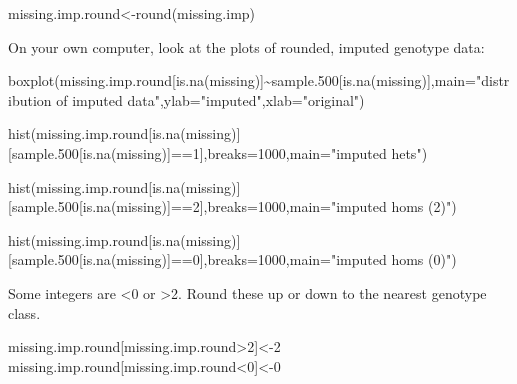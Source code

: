 \documentclass[
]{book}
\newenvironment{Shaded}{\begin{snugshade}}{\end{snugshade}}
\newcommand{\AttributeTok}[1]{\textcolor[rgb]{0.77,0.63,0.00}{#1}}
\newcommand{\DecValTok}[1]{\textcolor[rgb]{0.00,0.00,0.81}{#1}}
\newcommand{\FloatTok}[1]{\textcolor[rgb]{0.00,0.00,0.81}{#1}}
\newcommand{\FunctionTok}[1]{\textcolor[rgb]{0.00,0.00,0.00}{#1}}
\newcommand{\NormalTok}[1]{#1}
\newcommand{\OtherTok}[1]{\textcolor[rgb]{0.56,0.35,0.01}{#1}}
\newcommand{\SpecialCharTok}[1]{\textcolor[rgb]{0.00,0.00,0.00}{#1}}
\newcommand{\StringTok}[1]{\textcolor[rgb]{0.31,0.60,0.02}{#1}}
\begin{document}
\begin{Shaded}
\begin{Highlighting}[]
\NormalTok{missing.imp.round}\OtherTok{\textless{}{-}}\FunctionTok{round}\NormalTok{(missing.imp)}
\end{Highlighting}
\end{Shaded}

On your own computer, look at the plots of rounded, imputed genotype data:

\begin{Shaded}
\begin{Highlighting}[]
\FunctionTok{boxplot}\NormalTok{(missing.imp.round[}\FunctionTok{is.na}\NormalTok{(missing)]}\SpecialCharTok{\textasciitilde{}}\NormalTok{sample}\FloatTok{.500}\NormalTok{[}\FunctionTok{is.na}\NormalTok{(missing)],}\AttributeTok{main=}\StringTok{"distribution of imputed data"}\NormalTok{,}\AttributeTok{ylab=}\StringTok{"imputed"}\NormalTok{,}\AttributeTok{xlab=}\StringTok{"original"}\NormalTok{)}

\FunctionTok{hist}\NormalTok{(missing.imp.round[}\FunctionTok{is.na}\NormalTok{(missing)][sample}\FloatTok{.500}\NormalTok{[}\FunctionTok{is.na}\NormalTok{(missing)]}\SpecialCharTok{==}\DecValTok{1}\NormalTok{],}\AttributeTok{breaks=}\DecValTok{1000}\NormalTok{,}\AttributeTok{main=}\StringTok{"imputed hets"}\NormalTok{)}

\FunctionTok{hist}\NormalTok{(missing.imp.round[}\FunctionTok{is.na}\NormalTok{(missing)][sample}\FloatTok{.500}\NormalTok{[}\FunctionTok{is.na}\NormalTok{(missing)]}\SpecialCharTok{==}\DecValTok{2}\NormalTok{],}\AttributeTok{breaks=}\DecValTok{1000}\NormalTok{,}\AttributeTok{main=}\StringTok{"imputed homs (2)"}\NormalTok{)}

\FunctionTok{hist}\NormalTok{(missing.imp.round[}\FunctionTok{is.na}\NormalTok{(missing)][sample}\FloatTok{.500}\NormalTok{[}\FunctionTok{is.na}\NormalTok{(missing)]}\SpecialCharTok{==}\DecValTok{0}\NormalTok{],}\AttributeTok{breaks=}\DecValTok{1000}\NormalTok{,}\AttributeTok{main=}\StringTok{"imputed homs (0)"}\NormalTok{) }
\end{Highlighting}
\end{Shaded}

Some integers are \textless0 or \textgreater2. Round these up or down to the nearest genotype class.

\begin{Shaded}
\begin{Highlighting}[]
\NormalTok{missing.imp.round[missing.imp.round}\SpecialCharTok{\textgreater{}}\DecValTok{2}\NormalTok{]}\OtherTok{\textless{}{-}}\DecValTok{2}
\NormalTok{missing.imp.round[missing.imp.round}\SpecialCharTok{\textless{}}\DecValTok{0}\NormalTok{]}\OtherTok{\textless{}{-}}\DecValTok{0}
\end{Highlighting}
\end{Shaded}
\end{document}
